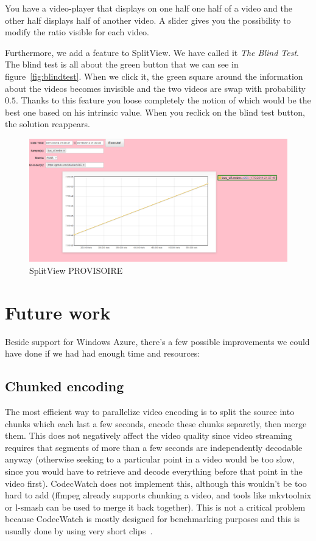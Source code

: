 \documentclass[a4paper,12pt]{article}
\begin{document}
You have a video-player that displays on one half one half of a video and the
other half displays half of another video. A slider gives you the possibility to
modify the ratio visible for each video.
     
Furthermore, we add a feature to SplitView. We have called it \emph{The Blind
Test}. The blind test is all about the green button that we can see in
figure~\ref{fig:blindtest}. When we click it, the green square around the
information about the videos becomes invisible and the two videos are swap with
probability $0.5$. Thanks to this feature you loose completely the notion of
which would be the best one based on his intrinsic value. When you reclick on
the blind test button, the solution reappears.
     
\begin{figure}[!h] \centering
  \includegraphics[width=1\textwidth]{figures/graph1.png}
  \caption{SplitView PROVISOIRE}
  \label{fig:graph2}
\end{figure}

\section{Future work}
Beside support for Windows Azure, there's a few possible improvements we could
have done if we had had enough time and resources:
\subsection{Chunked encoding}
The most efficient way to parallelize video encoding is to split the source into
chunks which each last a few seconds, encode these chunks separetly, then merge
them. This does not negatively affect the video quality since video streaming
requires that segments of more than a few seconds are independently decodable
anyway (otherwise seeking to a particular point in a video would be too slow,
since you would have to retrieve and decode everything before that point in the
video first). CodecWatch does not implement this, although this wouldn't be too
hard to add (ffmpeg already supports chunking a video, and tools like mkvtoolnix
or l-smash can be used to merge it back together). This is not a critical
problem because CodecWatch is mostly designed for benchmarking purposes and this
is usually done by using very short clips~\cite{derf}.
\end{document}
